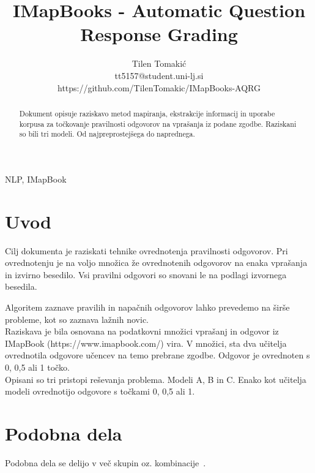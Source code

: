 \documentclass[journal]{IEEEtran}
\begin{document}
\title{IMapBooks - Automatic Question Response Grading}
\author{Tilen Tomakić\\tt5157@student.uni-lj.si\\https://github.com/TilenTomakic/IMapBooks-AQRG}%
\maketitle

\begin{abstract}	
  Dokument opisuje raziskavo metod mapiranja, ekstrakcije informacij in uporabe korpusa za točkovanje pravilnosti odgovorov na vprašanja iz podane zgodbe. Raziskani so bili tri modeli. Od najpreprostejšega do naprednega.
\end{abstract}

\begin{IEEEkeywords}
NLP, IMapBook
\end{IEEEkeywords}

\IEEEpeerreviewmaketitle

\section{Uvod}
Cilj dokumenta je raziskati tehnike ovrednotenja pravilnosti odgovorov. Pri ovrednotenju je na voljo množica že ovrednotenih odgovorov na enaka vprašanja in izvirno besedilo. Vsi pravilni odgovori so snovani le na podlagi izvornega besedila.

Algoritem zaznave pravilih in napačnih odgovorov lahko prevedemo na širše probleme, kot so zaznava lažnih novic.\\

Raziskava je bila osnovana na podatkovni množici vprašanj in odgovor iz IMapBook (https://www.imapbook.com/) vira. V množici, sta dva učitelja ovrednotila odgovore učencev na temo prebrane zgodbe. Odgovor je ovrednoten s 0, 0,5 ali 1 točko.\\

Opisani so tri pristopi reševanja problema. Modeli A, B in C. Enako kot učitelja modeli ovrednotijo odgovore s točkami 0, 0,5 ali 1.

\section{Podobna dela}
Podobna dela se delijo v več skupin oz. kombinacije~\cite{adhya2016automated}.
\end{document}
